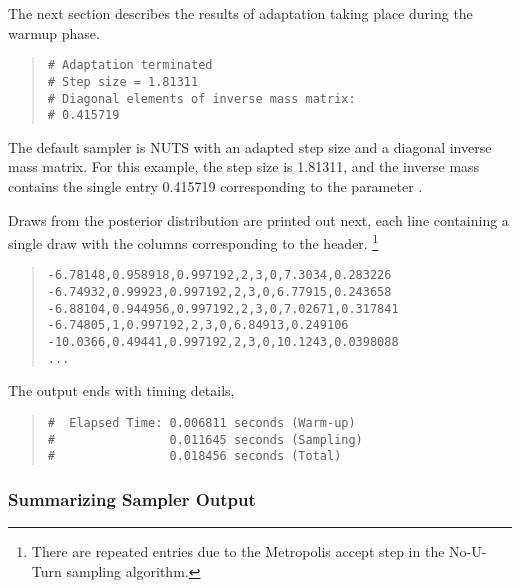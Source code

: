 The next section describes the results of adaptation taking place during
the warmup phase.
%
\begin{quote}
\begin{Verbatim}[fontsize=\small]
# Adaptation terminated
# Step size = 1.81311
# Diagonal elements of inverse mass matrix:
# 0.415719
\end{Verbatim}
\end{quote}
%
The default sampler is NUTS with an adapted step size and a diagonal
inverse mass matrix.  For this example, the step size is 1.81311, and
the inverse mass contains the single entry 0.415719 corresponding to
the parameter .

Draws from the posterior distribution are printed out next, each line
containing a single draw with the columns corresponding to the
header.
%
\footnote{There are repeated entries due to the Metropolis accept step
in the No-U-Turn sampling algorithm.}
%
%
\begin{quote}
\begin{Verbatim}[fontsize=\small]
-6.78148,0.958918,0.997192,2,3,0,7.3034,0.283226
-6.74932,0.99923,0.997192,2,3,0,6.77915,0.243658
-6.88104,0.944956,0.997192,2,3,0,7.02671,0.317841
-6.74805,1,0.997192,2,3,0,6.84913,0.249106
-10.0366,0.49441,0.997192,2,3,0,10.1243,0.0398088
...
\end{Verbatim}
\end{quote}
%

The output ends with timing details,%
\begin{quote}
\begin{Verbatim}[fontsize=\small]
#  Elapsed Time: 0.006811 seconds (Warm-up)
#                0.011645 seconds (Sampling)
#                0.018456 seconds (Total)
\end{Verbatim}
\end{quote}


\subsubsection{Summarizing Sampler Output}

